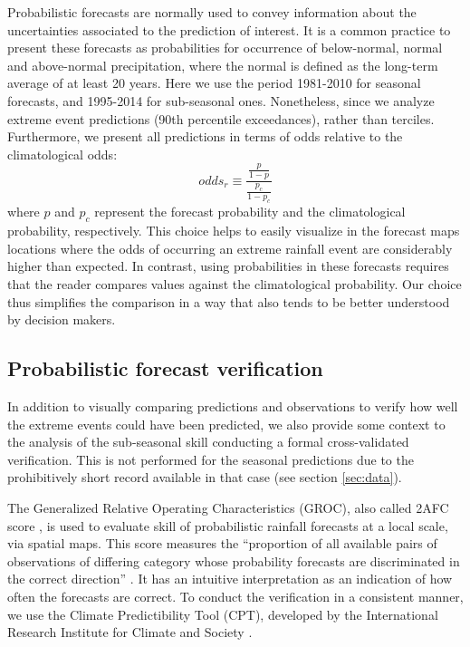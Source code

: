 \documentclass{ametsoc}
\begin{document}
Probabilistic forecasts are normally used to convey information about the uncertainties associated to the prediction of interest.
It is a common practice to present these forecasts as probabilities for occurrence of below-normal, normal and above-normal precipitation, where the normal is defined as the long-term average of at least 20 years.
Here we use the period 1981-2010 for seasonal forecasts, and 1995-2014 for sub-seasonal ones.
Nonetheless, since we analyze extreme event predictions (90th percentile exceedances), rather than terciles.
Furthermore, we present all predictions in terms of odds relative to the climatological odds:
\begin{equation} \label{eq:odds-ratio}
odds_{r} \equiv \frac{\frac{p}{1-p}}{\frac{p_c}{1-p_c}}
\end{equation}
where $p$ and $p_c$ represent the forecast probability and the climatological probability, respectively.
This choice helps to easily visualize in the forecast maps locations where the odds of occurring an extreme rainfall event are considerably higher than expected.
In contrast, using probabilities in these forecasts requires that the reader compares values against the climatological probability.
Our choice thus simplifies the comparison in a way that  also tends to be better understood by decision makers.

\subsection{Probabilistic forecast verification}

In addition to visually comparing predictions and observations to verify how well the extreme events could have been predicted, we also provide some context to the analysis of the sub-seasonal skill conducting a formal cross-validated verification.
This is not performed for the seasonal predictions due to the prohibitively short record available in that case (see section \ref{sec:data}).

The Generalized Relative Operating Characteristics (GROC), also called 2AFC score \citep{Mason:2009kr}, is used to evaluate skill of probabilistic rainfall forecasts at a local scale, via spatial maps.
This score measures the ``proportion of all available pairs of observations of differing category whose probability forecasts are discriminated in the correct direction'' \citep{Mason:2009kr}.
It has an intuitive interpretation as an indication of how often the forecasts are correct.
To conduct the verification in a consistent manner, we use the Climate Predictibility Tool (CPT), developed by the International Research Institute for Climate and Society \citep{Mason:2017gg}.
\end{document}

